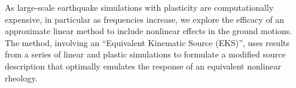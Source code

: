  As large-scale earthquake simulations with plasticity are computationally expensive, in particular as frequencies increase, we explore the efficacy of an approximate linear method to include nonlinear effects in the ground motions. The method, involving an ``Equivalent Kinematic Source (EKS)'', uses results from a series of linear and plastic simulations to formulate a modified source description that optimally emulates the response of an equivalent nonlinear rheology.
 
\renewcommand{\thetable}{\arabic{table}}
\renewcommand{\thefigure}{\arabic{figure}}



